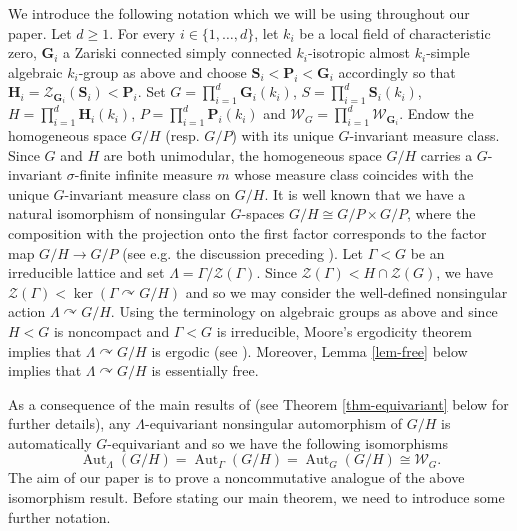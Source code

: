 \documentclass[11pt]{amsart}
\numberwithin{equation}{section}
\theoremstyle{plain}
\theoremstyle{definition}
\newcommand{\Aut}{\operatorname{Aut}}
\begin{document}
We introduce the following notation which we will be using throughout our paper. Let $d \geq 1$. For every $i \in \{1, \dots, d\}$, let $k_i$ be a local field of characteristic zero, $\mathbf G_i$ a Zariski connected simply connected $k_i$-isotropic almost $k_i$-simple algebraic $k_i$-group as above and choose $\mathbf S_i < \mathbf P_i < \mathbf G_i$ accordingly so that $\mathbf H_i = \mathscr Z_{\mathbf G_i}(\mathbf S_i) < \mathbf P_i$. Set $G = \prod_{i = 1}^d \mathbf G_i(k_i)$, $S = \prod_{i = 1}^d \mathbf S_i(k_i)$, $H = \prod_{i = 1}^d \mathbf H_i(k_i)$, $P = \prod_{i = 1}^d \mathbf P_i(k_i)$ and $\mathscr W_G = \prod_{i = 1}^d \mathscr W_{\mathbf G_i}$. Endow the homogeneous space $G/H$ (resp.\! $G/P$) with its unique $G$-invariant measure class. Since $G$ and $H$ are both unimodular, the homogeneous space $G/H$ carries a $G$-invariant $\sigma$-finite infinite measure $m$ whose measure class coincides with the unique $G$-invariant measure class on $G/H$. It is well known that we have a natural isomorphism of nonsingular $G$-spaces $G/H \cong G/P \times G/P$, where the composition with the projection onto the first factor corresponds to the factor map $G/H \to G/P$ (see e.g.\! the discussion preceding \cite[Theorem 3]{BF11}). Let $\Gamma < G$ be an irreducible lattice and set $\Lambda = \Gamma/\mathscr Z(\Gamma)$. Since $\mathscr Z(\Gamma) < H \cap \mathscr Z(G)$, we have $\mathscr Z(\Gamma) < \ker(\Gamma \curvearrowright G/H)$ and so we may consider the well-defined nonsingular action $\Lambda \curvearrowright G/H$. Using the terminology on algebraic groups as above and since $H < G$ is noncompact and $\Gamma < G$ is irreducible, Moore's ergodicity theorem implies that $\Lambda \curvearrowright G/H$ is ergodic (see \cite{HM77}). Moreover, Lemma \ref{lem-free} below implies that $\Lambda \curvearrowright G/H$ is essentially free.


As a consequence of the main results of \cite{BFGW12} (see Theorem \ref{thm-equivariant} below for further details), any $\Lambda$-equivariant nonsingular automorphism of $G/H$ is automatically $G$-equivariant and so we have the following isomorphisms
$$\Aut_\Lambda(G/H) = \Aut_\Gamma(G/H) = \Aut_G(G/H) \cong \mathscr W_G.$$
The aim of our paper is to prove a noncommutative analogue of the above isomorphism result. Before stating our main theorem, we need to introduce some further notation.
\end{document}
